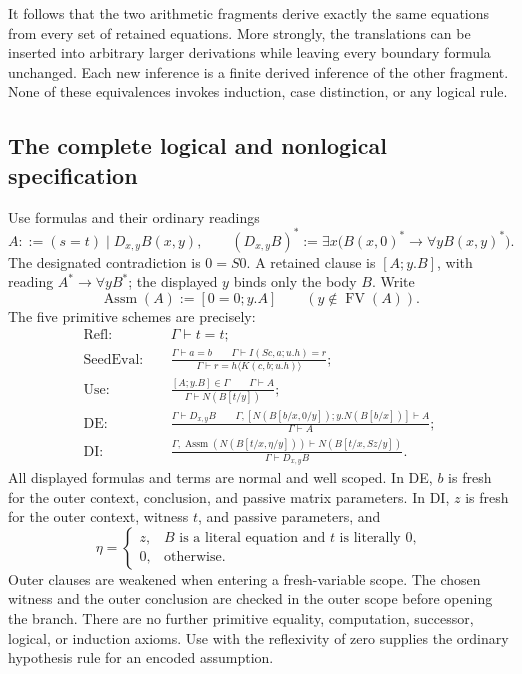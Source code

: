 \documentclass[11pt,letterpaper]{article}
\begin{document}
It follows that the two arithmetic fragments derive exactly the same
equations from every set of retained equations.  More strongly, the
translations can be inserted into arbitrary larger derivations while
leaving every boundary formula unchanged.  Each new inference is a
finite derived inference of the other fragment.  None of these
equivalences invokes induction, case distinction, or any logical rule.

\subsection{The complete logical and nonlogical specification}

Use formulas and their ordinary readings
\[
 A::=(s=t)\mid D_{x,y}B(x,y),\qquad
 (D_{x,y}B)^*:=\exists x\bigl(B(x,0)^*\to\forall y B(x,y)^*\bigr).
\]
The designated contradiction is $0=S0$.  A retained clause is
$[A;y.B]$, with reading $A^*\to\forall y B^*$; the displayed $y$
binds only the body $B$.  Write
\[
             \operatorname{Assm}(A):=[0=0;y.A]
             \qquad (y\notin\operatorname{FV}(A)).
\]
The five primitive schemes are precisely:
\begin{align*}
 \mathrm{Refl}:\quad&\Gamma\vdash t=t;\\[1mm]
 \mathrm{SeedEval}:\quad&
 \frac{\Gamma\vdash a=b\qquad\Gamma\vdash I(Sc,a;u.h)=r}
      {\Gamma\vdash r=h\langle K(c,b;u.h)\rangle};\\[2mm]
 \mathrm{Use}:\quad&
 \frac{[A;y.B]\in\Gamma\qquad\Gamma\vdash A}
      {\Gamma\vdash N(B[t/y])};\\[2mm]
 \mathrm{DE}:\quad&
 \frac{\Gamma\vdash D_{x,y}B\qquad
       \Gamma,[N(B[b/x,0/y]);y.N(B[b/x])]\vdash A}
      {\Gamma\vdash A};\\[2mm]
 \mathrm{DI}:\quad&
 \frac{\Gamma,\operatorname{Assm}(N(B[t/x,\eta/y]))
           \vdash N(B[t/x,Sz/y])}
      {\Gamma\vdash D_{x,y}B}.
\end{align*}
All displayed formulas and terms are normal and well scoped.
In DE, $b$ is fresh for the outer context, conclusion, and passive matrix parameters.
In DI, $z$ is fresh for the outer context, witness $t$, and passive
parameters, and
\[
 \eta=
 \begin{cases}
 z,&B\text{ is a literal equation and }t\text{ is literally }0,\\
 0,&\text{otherwise}.
 \end{cases}
\]
Outer clauses are weakened when entering a fresh-variable scope.
The chosen witness and the outer conclusion are checked in the outer
scope before opening the branch.  There are no further primitive
equality, computation, successor, logical, or induction axioms.
Use with the reflexivity of zero supplies the ordinary hypothesis rule
for an encoded assumption.
\end{document}
